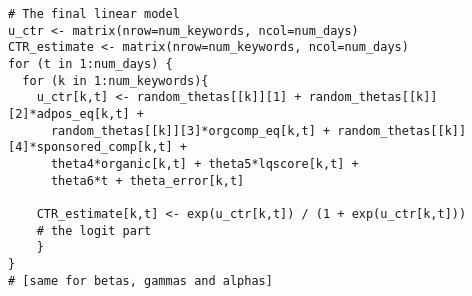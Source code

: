 \begin{lstlisting}[caption={Code for simulating the parameters, shown for $\theta$.}]
# The final linear model
u_ctr <- matrix(nrow=num_keywords, ncol=num_days)
CTR_estimate <- matrix(nrow=num_keywords, ncol=num_days)
for (t in 1:num_days) {
  for (k in 1:num_keywords){
    u_ctr[k,t] <- random_thetas[[k]][1] + random_thetas[[k]][2]*adpos_eq[k,t] +
      random_thetas[[k]][3]*orgcomp_eq[k,t] + random_thetas[[k]][4]*sponsored_comp[k,t] +
      theta4*organic[k,t] + theta5*lqscore[k,t] +
      theta6*t + theta_error[k,t]
      
    CTR_estimate[k,t] <- exp(u_ctr[k,t]) / (1 + exp(u_ctr[k,t]))
    # the logit part
    }
}
# [same for betas, gammas and alphas]

\end{lstlisting}